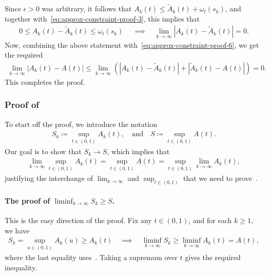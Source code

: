\documentclass{article}
\theoremstyle{plain}
\theoremstyle{definition}
\newcommand{\qtext}[1]{\quad \text{#1} \quad}
\begin{document}
Since $\epsilon>0$ was arbitrary, it follows that $A_k(t) \leq \widetilde{A}_k(t) + \omega_t(s_k)$, and  together with~\eqref{eq:approx-constraint-proof-3}, this implies that  
\begin{align}
    0 \leq A_k(t) - \widetilde{A}_k(t) \leq \omega_t(s_k) \;   \quad \implies \quad 
    \lim_{k \to \infty} \left \lvert A_k(t) - \widetilde{A}_k(t) \right \rvert = 0. \label{eq:approx-constraint-proof-5}
\end{align}
Now, combining the above statement with~\eqref{eq:approx-constraint-proof-6}, we get the required 
\begin{align}
    \lim_{k \to \infty} \left\lvert A_k(t) - A(t) \right\rvert \leq \lim_{k \to \infty} \left( \left\lvert A_k(t) - \widetilde{A}_k(t) \right\rvert  +  \left\lvert \widetilde{A}_k(t) - A(t) \right\rvert  \right) = 0. 
\end{align}
This completes the proof. 










\subsubsection{Proof of~}
\label{proof:approx-constraint-unique-limit}

To start off the proof, we introduce the notation 
\begin{align}
    S_k \coloneqq \sup_{t \in (0,1)} A_k(t), \qtext{and} S \coloneqq \sup_{t \in (0,1)} A(t). 
\end{align}
Our goal is to show that $S_k \to S$, which implies that 
\begin{align}
    \lim_{k \to \infty}  \sup_{t \in (0,1)} A_k(t) = \sup_{t \in (0,1)} A(t) = \sup_{t \in (0,1)} \lim_{k \to \infty} A_k(t), 
\end{align}
justifying the interchange of $\lim_{k \to \infty}$ and $\sup_{t \in (0,1)}$ that we need to prove~. 

\paragraph{The proof of $\liminf_{k \to \infty} S_k \geq S$.} This is the easy direction of the proof. Fix any $t \in (0,1)$, and for each $k \geq 1$, we have 
\begin{align}
    S_k = \sup_{u \in (0,1)} A_k(u)  \geq A_k(t) \quad \implies \quad \liminf_{k \to \infty} S_k \geq \liminf_{k \to \infty} A_k(t) = A(t),  
\end{align}
where the last equality uses~. Taking a supremum over $t$ gives the required inequality. 
\end{document}

